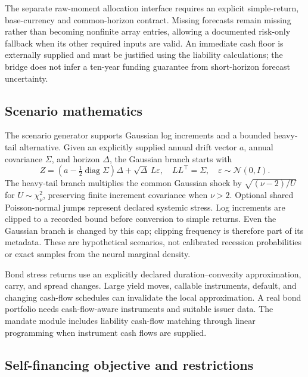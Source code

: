 \documentclass[11pt,a4paper]{article}
\newcommand{\diag}{\operatorname{diag}}
\begin{document}
The separate raw-moment allocation interface requires an explicit simple-return, base-currency and common-horizon contract. Missing forecasts remain missing rather than becoming nonfinite array entries, allowing a documented risk-only fallback when its other required inputs are valid. An immediate cash floor is externally supplied and must be justified using the liability calculations; the bridge does not infer a ten-year funding guarantee from short-horizon forecast uncertainty.

\subsection{Scenario mathematics}

The scenario generator supports Gaussian log increments and a bounded heavy-tail alternative. Given an explicitly supplied annual drift vector $a$, annual covariance $\Sigma$, and horizon $\Delta$, the Gaussian branch starts with
\begin{equation}
Z=(a-\tfrac12\diag\Sigma)\Delta+\sqrt\Delta\,L\varepsilon,\quad LL^\top=\Sigma,\quad\varepsilon\sim\mathcal N(0,I).
\end{equation}
The heavy-tail branch multiplies the common Gaussian shock by $\sqrt{(\nu-2)/U}$ for $U\sim\chi^2_\nu$, preserving finite increment covariance when $\nu>2$. Optional shared Poisson-normal jumps represent declared systemic stress. Log increments are clipped to a recorded bound before conversion to simple returns. Even the Gaussian branch is changed by this cap; clipping frequency is therefore part of its metadata. These are hypothetical scenarios, not calibrated recession probabilities or exact samples from the neural marginal density.

Bond stress returns use an explicitly declared duration--convexity approximation, carry, and spread changes. Large yield moves, callable instruments, default, and changing cash-flow schedules can invalidate the local approximation. A real bond portfolio needs cash-flow-aware instruments and suitable issuer data. The mandate module includes liability cash-flow matching through linear programming when instrument cash flows are supplied.

\subsection{Self-financing objective and restrictions}
\end{document}
